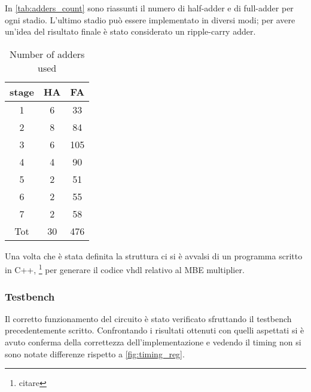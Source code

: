 In \autoref{tab:adders_count} sono riassunti il numero di half-adder e di full-adder per ogni stadio. L'ultimo stadio può essere implementato in diversi modi; per avere un'idea del risultato finale è stato considerato un ripple-carry adder.
\begin{table}[htb]
	\centering
	\begin{tabular}{ccc}
		stage & HA & FA \\
		\hline
		1 & 6 & 33\\
		2 & 8 & 84\\
		3 & 6 & 105\\
		4 & 4 & 90\\
		5 & 2 & 51\\
		6 & 2 & 55\\
		7 & 2 & 58\\
		Tot & 30 & 476\\
	\end{tabular}
	\label{tab:adders_count}
	\caption{Number of adders used}
\end{table}
Una volta che è stata definita la struttura ci si è avvalsi di un programma scritto in C++, \footnote{citare} per generare il codice vhdl relativo al MBE multiplier.

\subsubsection{Testbench}
Il corretto funzionamento del circuito è stato verificato sfruttando il testbench precedentemente scritto. Confrontando i risultati ottenuti con quelli aspettati si è avuto conferma della correttezza dell'implementazione e vedendo il timing non si sono notate differenze rispetto a \autoref{fig:timing_reg}.
